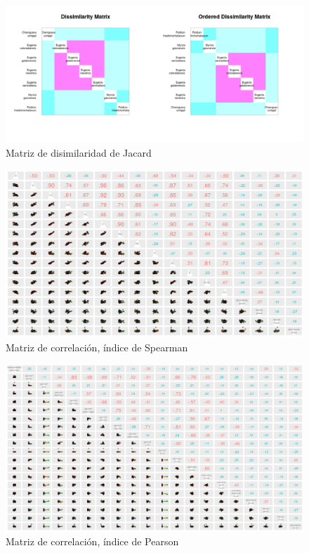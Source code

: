 \documentclass[11pt,]{article}
\begin{document}
\begin{figure}
\centering
\includegraphics{Disimilaridad_.png}
\caption{Matriz de disimilaridad de Jacard \label{fig:matriz_Jacard}}
\end{figure}

\begin{figure}
\centering
\includegraphics{matriz_correlacion_suelo_abun_riq_spearman.png}
\caption{Matriz de correlación, índice de Spearman
\label{fig:matriz_spearman}}
\end{figure}

\begin{figure}
\centering
\includegraphics{matriz_correlacion_geomorf_abun_riq_spearman.png}
\caption{Matriz de correlación, índice de Pearson
\label{fig:matriz_pearson}}
\end{figure}
\end{document}
